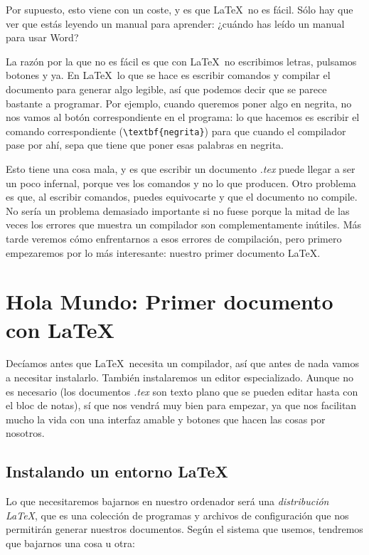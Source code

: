 \documentclass[palatino]{apuntes}
\begin{document}
Por supuesto, esto viene con un coste, y es que \LaTeX\ no es fácil. Sólo hay que ver que estás leyendo un manual para aprender: ¿cuándo has leído un manual para usar Word?

La razón por la que no es fácil es que con \LaTeX\ no escribimos letras, pulsamos botones y ya. En \LaTeX\ lo que se hace es escribir comandos y compilar el documento para generar algo legible, así que podemos decir que se parece bastante a programar. Por ejemplo, cuando queremos poner algo en negrita, no nos vamos al botón correspondiente en el programa: lo que hacemos es escribir el comando correspondiente (\verb|\textbf{negrita}|) para que cuando el compilador pase por ahí, sepa que tiene que poner esas palabras en negrita.

Esto tiene una cosa mala, y es que escribir un documento \textit{.tex} puede llegar a ser un poco infernal, porque ves los comandos y no lo que producen. Otro problema es que, al escribir comandos, puedes equivocarte y que el documento no compile. No sería un problema demasiado importante si no fuese porque la mitad de las veces los errores que muestra un compilador son complementamente inútiles. Más tarde veremos cómo enfrentarnos a esos errores de compilación, pero primero empezaremos por lo más interesante: nuestro primer documento \LaTeX{}.

\section{Hola Mundo: Primer documento con \LaTeX}

Decíamos antes que \LaTeX\ necesita un compilador, así que antes de nada vamos a necesitar instalarlo. También instalaremos un editor especializado. Aunque no es necesario (los documentos \textit{.tex} son texto plano que se pueden editar hasta con el bloc de notas), sí que nos vendrá muy bien para empezar, ya que nos facilitan mucho la vida con una interfaz amable y botones que hacen las cosas por nosotros.

\subsection{Instalando un entorno \LaTeX}

Lo que necesitaremos bajarnos en nuestro ordenador será una \textit{distribución \LaTeX}, que es una colección de programas y archivos de configuración que nos permitirán generar nuestros documentos. Según el sistema que usemos, tendremos que bajarnos una cosa u otra:
\end{document}
